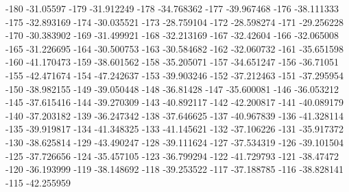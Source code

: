-180                       -31.05597
-179                      -31.912249
-178                      -34.768362
-177                      -39.967468
-176                      -38.111333
-175                      -32.893169
-174                      -30.035521
-173                      -28.759104
-172                      -28.598274
-171                      -29.256228
-170                      -30.383902
-169                      -31.499921
-168                      -32.213169
-167                       -32.42604
-166                      -32.065008
-165                      -31.226695
-164                      -30.500753
-163                      -30.584682
-162                      -32.060732
-161                      -35.651598
-160                      -41.170473
-159                      -38.601562
-158                      -35.205071
-157                      -34.651247
-156                       -36.71051
-155                      -42.471674
-154                      -47.242637
-153                      -39.903246
-152                      -37.212463
-151                      -37.295954
-150                      -38.982155
-149                      -39.050448
-148                       -36.81428
-147                      -35.600081
-146                      -36.053212
-145                      -37.615416
-144                      -39.270309
-143                      -40.892117
-142                      -42.200817
-141                      -40.089179
-140                      -37.203182
-139                      -36.247342
-138                      -37.646625
-137                      -40.967839
-136                      -41.328114
-135                      -39.919817
-134                      -41.348325
-133                      -41.145621
-132                      -37.106226
-131                      -35.917372
-130                      -38.625814
-129                      -43.490247
-128                      -39.111624
-127                      -37.534319
-126                      -39.101504
-125                      -37.726656
-124                      -35.457105
-123                      -36.799294
-122                      -41.729793
-121                       -38.47472
-120                      -36.193999
-119                      -38.148692
-118                      -39.253522
-117                      -37.188785
-116                      -38.828141
-115                      -42.255959
